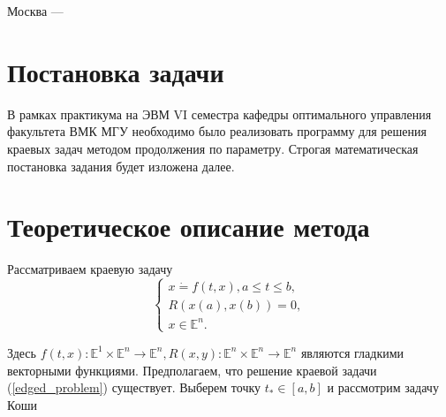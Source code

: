 \begin{titlepage}


{\large Москва --- \the\year}\\[1cm] %


 

\vfill %

\end{titlepage}
\setcounter{page}{2}
\tableofcontents
\newpage

\section {Постановка задачи}
\tolerance
В рамках практикума на ЭВМ VI семестра 
кафедры оптимального управ\-ления 
факультета ВМК МГУ необходимо было реализовать программу 
для решения краевых задач методом продолжения по параметру. 
Стро\-гая математическая постановка задания будет изложена далее.
\section {Теоретическое описание метода}
\tolerance
Рассматриваем краевую задачу
\begin {equation}
\label {edged_problem}
\begin{cases} 
x\dot = f(t,x), a\leq t\leq b, \\
R(x(a),x(b)) = 0,\\
x\in\mathbb{E}^n.
\end{cases}
\end{equation}

Здесь $f(t,x):\mathbb{E}^1\times\mathbb{E}^n\to\mathbb{E}^n, R(x,y):\mathbb{E}^n\times\mathbb{E}^n\to\mathbb{E}^n$ являются гладкими векторными функциями. Предполагаем, что решение краевой задачи
(\ref{edged_problem}) существует. Выберем точку $t_*\in[a,b]$ и рассмотрим задачу Коши

